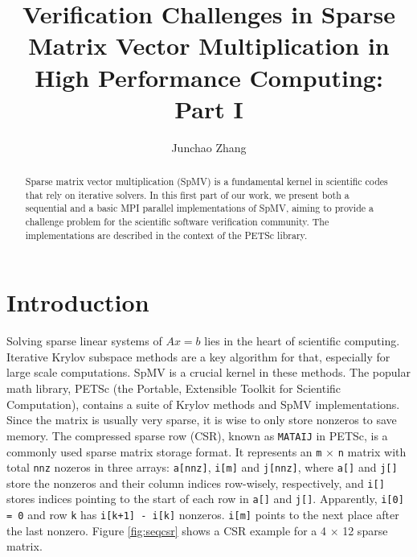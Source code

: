 \documentclass[creativecommons]{eptcs}
\title{Verification Challenges in Sparse Matrix Vector Multiplication in High Performance Computing: Part I}
\author{Junchao Zhang
\institute{Argonne National Laboratory\\Illinois, USA}
\email{jczhang@anl.gov}
}
\begin{document}
\maketitle

\begin{abstract}
Sparse matrix vector multiplication (SpMV) is a fundamental kernel in scientific codes
that rely on iterative solvers. In this first part of our work,
we present both a sequential and a basic MPI parallel implementations of
SpMV, aiming to provide a challenge problem for the scientific software verification community.
The implementations are described in the context of the PETSc library.

\end{abstract}

\section{Introduction}
Solving sparse linear systems of $Ax=b$ lies in the heart of scientific computing.
Iterative Krylov subspace methods \cite{saad2003iterative} are a key algorithm for that,
especially for large scale computations.
SpMV is a crucial kernel in these methods.
The popular math library, PETSc (the Portable, Extensible Toolkit for Scientific Computation)\cite{petsc-user-ref}, contains
a suite of Krylov methods and SpMV implementations.
Since the matrix is usually very sparse,
it is wise to only store nonzeros to save memory.
The compressed sparse row (CSR), known as {\tt MATAIJ} in PETSc,
is a commonly used sparse matrix storage format.
It represents an {\tt m} $\times$ {\tt n} matrix with total {\tt nnz} nozeros in three arrays: {\tt a[nnz]}, {\tt i[m]} and {\tt j[nnz]},
 where {\tt a[]} and {\tt j[]} store the nonzeros and their column indices row-wisely, respectively, and {\tt i[]}
stores indices pointing to the start of each row in {\tt a[]} and {\tt j[]}.
Apparently, {\tt i[0] = 0} and row {\tt k} has {\tt i[k+1] - i[k]} nonzeros. {\tt i[m]} points to the next place
after the last nonzero. Figure \ref{fig:seqcsr} shows a CSR example for a 4 $\times$ 12 sparse matrix.
\end{document}
